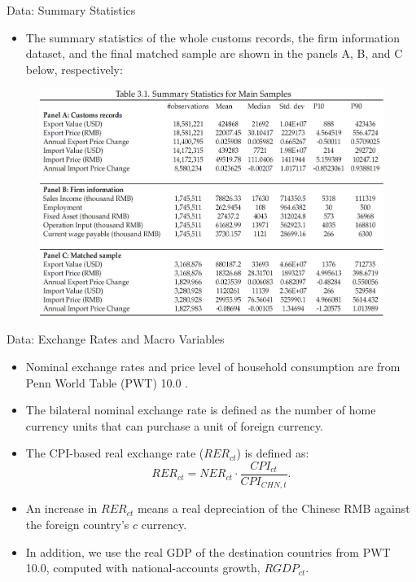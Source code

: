 \documentclass[10pt]{beamer}
\begin{document}
\begin{frame}{Data: Summary Statistics}
	\begin{itemize}
		\item The summary statistics of the whole customs records, the firm information dataset, and the final matched sample are shown in the panels A, B, and C below, respectively:
	\end{itemize}
	\begin{figure}[htbp]
		\centering
		\includegraphics[height=0.65\textheight]{Table3.1.jpg}
		\label{tab3.1}
	\end{figure}
\end{frame}

\begin{frame}{Data: Exchange Rates and Macro Variables}
	\begin{itemize}
		\item Nominal exchange rates and price level of household consumption are from Penn World Table (PWT) 10.0 \cite{feenstra2015}.
		\item The bilateral nominal exchange rate is defined as the number of home currency units that can purchase a unit of foreign currency.
		\item The CPI-based real exchange rate ($RER_{ct}$) is defined as:
		$$
		RER_{ct}=NER_{ct} \cdot \frac{CPI_{ct}}{CPI_{CHN,t}}.
		$$
		\item An increase in $RER_{ct}$ means a real depreciation of the Chinese RMB against the
		foreign country’s $c$ currency.
		\item In addition, we use the real GDP of the destination countries from PWT 10.0, computed with national-accounts growth, $RGDP_{ct}$.
	\end{itemize}
\end{frame}
\end{document}
